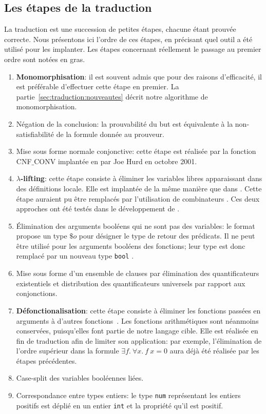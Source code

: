 \subsection{Les étapes de la traduction}
La traduction est une succession de petites étapes, chacune étant
prouvée correcte. Nous présentons ici l'ordre de ces étapes, en
précisant quel outil a été utilisé pour les implanter. Les étapes
concernant réellement le passage au premier ordre sont notées en gras.
\begin{enumerate}
\item \textbf{Monomorphisation}: il est souvent admis que pour des
  raisons d'efficacité, il est préférable d'effectuer cette étape en
  premier. La partie~\ref{sec:traduction:nouveautes} décrit notre
  algorithme de monomorphisation.
  \item Négation de la conclusion: la prouvabilité du but est
    équivalente à la non-satisfiabilité de la formule donnée au
    prouveur.
  \item Mise sous forme normale conjonctive: cette étape est réalisée
    par la fonction \textsf{CNF$\_$CONV} implantée en \holfour par Joe
    Hurd en octobre 2001.
  \item \textbf{$\lambda$-lifting}: cette étape consiste à éliminer les
    variables libres apparaissant dans des définitions locale. Elle est
    implantée de la même manière que dans \cite{Bohme12}. Cette étape
    auraient pu être remplacés par l'utilisation de combinateurs
    \cite{Hurd03}. Ces deux approches ont été testés dans le
    développement de \sledgehammer \cite{MengP08}.
  \item Élimination des arguments booléens qui ne sont pas des
    variables: le format \tff propose un type $\$o$ pour désigner le
    type de retour des prédicats. Il ne peut être utilisé pour les
    arguments booléens des fonctions; leur type est donc remplacé par un
    nouveau type \verb!bool! \cite{MengP08}.
  \item Mise sous forme d'un ensemble de clauses par élimination  des quantificateurs existentiels et distribution des quantificateurs universels par rapport aux conjonctions.
  \item \textbf{Défonctionalisation}: cette étape consiste à éliminer
    les fonctions passées en arguments à d'autres
    fonctions~\cite{Hurd03,MengP08}.
    Les fonctions arithmétiques sont néanmoins conservées, puisqu'elles
    font partie de notre langage cible. Elle est réalisée en fin de
    traduction afin de limiter son application: par exemple,
    l'élimination de l'ordre supérieur dans la formule $\exists f.\
    \forall x.\ f\ x = 0$ aura déjà été réalisée par les étapes
    précédentes.
  \item Case-split des variables booléennes liées.
  \item Correspondance entre types entiers: le type \holfour \verb!num!
    représentant les entiers positifs est déplié en un entier \verb!int!
    et la propriété qu'il est positif.
\end{enumerate}

